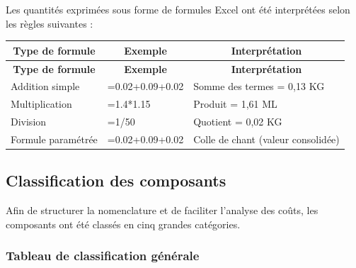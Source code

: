 \documentclass[12pt,a4paper]{article}
\begin{document}
Les quantités exprimées sous forme de formules Excel ont été interprétées selon les règles suivantes :

\begin{longtable}{|p{4cm}|p{4cm}|p{8cm}|}
\hline
\multicolumn{1}{|c|}{\textbf{Type de formule}} & \multicolumn{1}{c|}{\textbf{Exemple}} & \multicolumn{1}{c|}{\textbf{Interprétation}} \\
\hline
\endfirsthead
\hline
\multicolumn{1}{|c|}{\textbf{Type de formule}} & \multicolumn{1}{c|}{\textbf{Exemple}} & \multicolumn{1}{c|}{\textbf{Interprétation}} \\
\hline
\endhead
\hline
\endfoot
Addition simple & =0.02+0.09+0.02 & Somme des termes = 0,13 KG \\
Multiplication & =1.4*1.15 & Produit = 1,61 ML \\
Division & =1/50 & Quotient = 0,02 KG \\
Formule paramétrée & =0.02+0.09+0.02 & Colle de chant (valeur consolidée) \\
\hline
\end{longtable}

\subsection{Classification des composants}

Afin de structurer la nomenclature et de faciliter l'analyse des coûts, les composants ont été classés en cinq grandes catégories.

\subsubsection{Tableau de classification générale}
\end{document}
